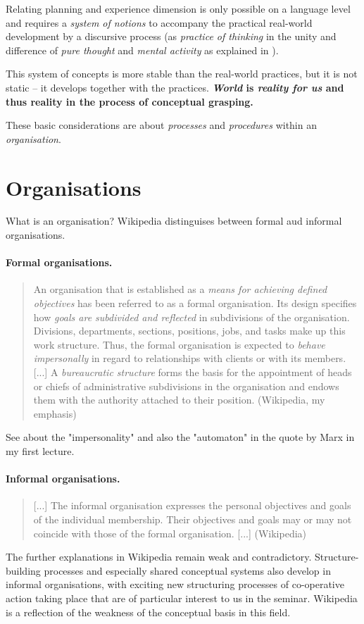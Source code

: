 \documentclass[11pt,a4paper]{article}
\begin{document}
Relating planning and experience dimension is only possible on a language
level and requires a \emph{system of notions} to accompany the practical
real-world development by a discursive process (as \emph{practice of thinking}
in the unity and difference of \emph{pure thought} and \emph{mental activity}
as explained in \cite[p. 33-51]{MSM}).

This system of concepts is more stable than the real-world practices, but it
is not static -- it develops together with the practices.
\textbf{\emph{World} is \emph{reality for us} and thus reality in the process
  of conceptual grasping.}

These basic considerations are about \emph{processes} and \emph{procedures}
within an \emph{organisation}.

\section{Organisations}

What is an organisation? Wikipedia distinguises between formal aud informal
organisations. 

\paragraph{Formal organisations.}
\begin{quote}
  An organisation that is established as a \emph{means for achieving defined
    objectives} has been referred to as a formal organisation. Its design
  specifies how \emph{goals are subdivided and reflected} in subdivisions of
  the organisation. Divisions, departments, sections, positions, jobs, and
  tasks make up this work structure. Thus, the formal organisation is expected
  to \emph{behave impersonally} in regard to relationships with clients or
  with its members. [...] A \emph{bureaucratic structure} forms the basis for
  the appointment of heads or chiefs of administrative subdivisions in the
  organisation and endows them with the authority attached to their position.
  (Wikipedia, my emphasis)
\end{quote}
See about the "impersonality" and also the "automaton" in the quote by Marx in
my first lecture.

\paragraph{Informal organisations.}
\begin{quote}
  [...] The informal organisation expresses the personal objectives and goals
  of the individual membership. Their objectives and goals may or may not
  coincide with those of the formal organisation. [...] (Wikipedia)
\end{quote}
The further explanations in Wikipedia remain weak and contradictory.
Structure-building processes and especially shared conceptual systems also
develop in informal organisations, with exciting new structuring processes
of co-operative action taking place that are of particular interest to us in
the seminar. Wikipedia is a reflection of the weakness of the conceptual basis
in this field.
\end{document}
